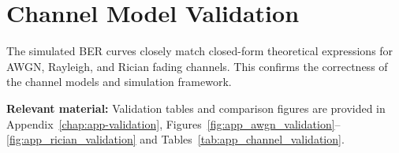 \section{Channel Model Validation}
\label{sec:channel-model-validation}

The simulated BER curves closely match closed-form theoretical expressions for AWGN, Rayleigh, and Rician fading channels.
This confirms the correctness of the channel models and simulation framework.

\textbf{Relevant material:}
Validation tables and comparison figures are provided in
Appendix~\ref{chap:app-validation}, Figures~\ref{fig:app_awgn_validation}--
\ref{fig:app_rician_validation} and Tables~\ref{tab:app_channel_validation}.